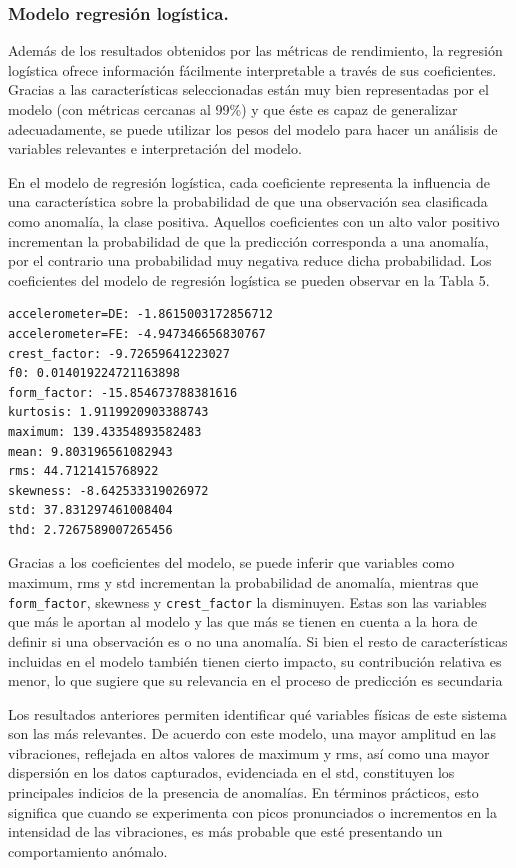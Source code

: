 \documentclass[11pt,a4paper,spanish]{book}
\numberwithin{equation}{chapter}
\numberwithin{figure}{chapter}
\begin{document}
\subsubsection{Modelo regresión logística.}

Además de los resultados obtenidos por las métricas de rendimiento, la regresión 
logística ofrece información fácilmente interpretable a través de sus coeficientes. 
Gracias a las características seleccionadas están muy bien representadas por el modelo 
(con métricas cercanas al 99\%) y que éste es capaz de generalizar adecuadamente, 
se puede utilizar los pesos del modelo para hacer un análisis de variables relevantes 
e interpretación del modelo.  


En el modelo de regresión logística, cada coeficiente representa la influencia de una 
característica sobre la probabilidad de que una observación sea clasificada como anomalía, 
la clase positiva. Aquellos coeficientes con un alto valor positivo incrementan la 
probabilidad de que la predicción corresponda a una anomalía, por el contrario una 
probabilidad muy negativa reduce dicha probabilidad. Los coeficientes del modelo de 
regresión logística se pueden observar en la Tabla 5. 


\vspace{5mm}
\begin{lstlisting}[language={}, basicstyle=\ttfamily\footnotesize\color{black}, frame=lines]
accelerometer=DE: -1.8615003172856712
accelerometer=FE: -4.947346656830767
crest_factor: -9.72659641223027
f0: 0.014019224721163898
form_factor: -15.854673788381616
kurtosis: 1.9119920903388743
maximum: 139.43354893582483
mean: 9.803196561082943
rms: 44.7121415768922
skewness: -8.642533319026972
std: 37.831297461008404
thd: 2.7267589007265456
\end{lstlisting}


Gracias a los coeficientes del modelo, se puede inferir que variables como maximum, rms 
y std incrementan la probabilidad de anomalía, mientras que \lstinline|form_factor|, 
skewness y \lstinline|crest_factor| la disminuyen. 
Estas son las variables que más le aportan al modelo y las que más se tienen en cuenta 
a la hora de definir si una observación es o no una anomalía. Si bien el resto de 
características incluidas en el modelo también tienen cierto impacto, su contribución 
relativa es menor, lo que sugiere que su relevancia en el proceso de predicción es 
secundaria


Los resultados anteriores permiten identificar qué variables físicas de este sistema son 
las más relevantes. De acuerdo con este modelo, una mayor amplitud en las vibraciones, 
reflejada en altos valores de maximum y rms, así como una mayor dispersión en los datos 
capturados, evidenciada en el std, constituyen los principales indicios de la presencia 
de anomalías. En términos prácticos, esto significa que cuando se experimenta con picos 
pronunciados o incrementos en la intensidad de las vibraciones, es más probable que esté 
presentando un comportamiento anómalo.
\end{document}
